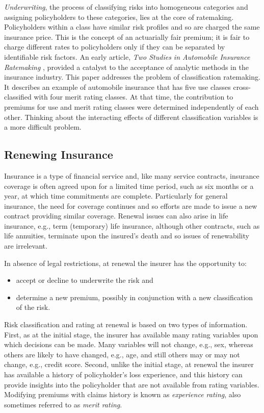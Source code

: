 \documentclass[]{book}
\theoremstyle{definition}
\theoremstyle{definition}
\theoremstyle{definition}
\theoremstyle{remark}
\begin{document}
\emph{Underwriting}, the process of classifying risks into homogeneous
categories and assigning policyholders to these categories, lies at the
core of ratemaking. Policyholders within a class have similar risk
profiles and so are charged the same insurance price. This is the
concept of an actuarially fair premium; it is fair to charge different
rates to policyholders only if they can be separated by identifiable
risk factors. An early article, \emph{Two Studies in Automobile
Insurance Ratemaking} \citep{bailey1960}, provided a catalyst to the
acceptance of analytic methods in the insurance industry. This paper
addresses the problem of classification ratemaking. It describes an
example of automobile insurance that has five use classes
cross-classified with four merit rating classes. At that time, the
contribution to premiums for use and merit rating classes were
determined independently of each other. Thinking about the interacting
effects of different classification variables is a more difficult
problem.

\subsection{Renewing Insurance}\label{renewing-insurance}

Insurance is a type of financial service and, like many service
contracts, insurance coverage is often agreed upon for a limited time
period, such as six months or a year, at which time commitments are
complete. Particularly for general insurance, the need for coverage
continues and so efforts are made to issue a new contract providing
similar coverage. Renewal issues can also arise in life insurance, e.g.,
term (temporary) life insurance, although other contracts, such as life
annuities, terminate upon the insured's death and so issues of
renewability are irrelevant.

In absence of legal restrictions, at renewal the insurer has the
opportunity to:

\begin{itemize}
\item
  accept or decline to underwrite the risk and
\item
  determine a new premium, possibly in conjunction with a new
  classification of the risk.
\end{itemize}

Risk classification and rating at renewal is based on two types of
information. First, as at the initial stage, the insurer has available
many rating variables upon which decisions can be made. Many variables
will not change, e.g., sex, whereas others are likely to have changed,
e.g., age, and still others may or may not change, e.g., credit score.
Second, unlike the initial stage, at renewal the insurer has available a
history of policyholder's loss experience, and this history can provide
insights into the policyholder that are not available from rating
variables. Modifying premiums with claims history is known as
\emph{experience rating}, also sometimes referred to as \emph{merit
rating}.
\end{document}
